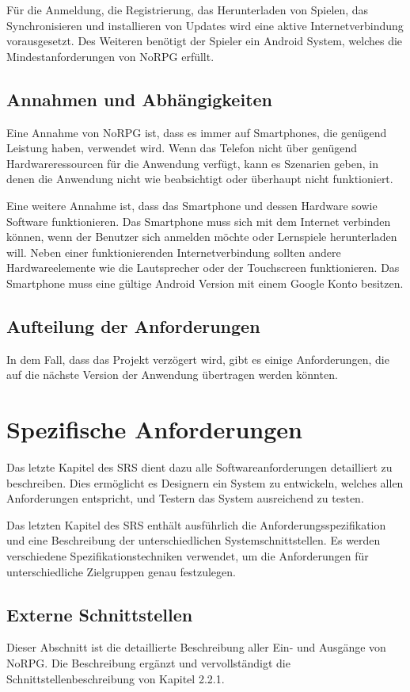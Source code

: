 		Für die Anmeldung, die Registrierung, das Herunterladen von Spielen, das Synchronisieren und installieren von Updates wird eine aktive Internetverbindung vorausgesetzt. Des Weiteren benötigt der Spieler ein Android System, welches die Mindestanforderungen von NoRPG erfüllt.
				
	\subsection{Annahmen und Abhängigkeiten}
		Eine Annahme von NoRPG ist, dass es immer auf Smartphones, die genügend Leistung haben, verwendet wird. Wenn das Telefon nicht über genügend Hardwareressourcen für die Anwendung verfügt, kann es Szenarien geben, in denen die Anwendung nicht wie beabsichtigt oder überhaupt nicht funktioniert.
		
		Eine weitere Annahme ist, dass das Smartphone und dessen Hardware sowie Software funktionieren. Das Smartphone muss sich mit dem Internet verbinden können, wenn der Benutzer sich anmelden möchte oder Lernspiele herunterladen will. Neben einer funktionierenden Internetverbindung sollten andere Hardwareelemente wie die Lautsprecher oder der Touchscreen funktionieren. Das Smartphone muss eine gültige Android Version mit einem Google Konto besitzen.
		
	\subsection{Aufteilung der Anforderungen}
		In dem Fall, dass das Projekt verzögert wird, gibt es einige Anforderungen, die auf die nächste Version der Anwendung übertragen werden könnten.

\section{Spezifische Anforderungen}
	Das letzte Kapitel des SRS dient dazu alle Softwareanforderungen detailliert zu beschreiben. Dies ermöglicht es Designern ein System zu entwickeln, welches allen Anforderungen entspricht, und Testern das System ausreichend zu testen.
	
	Das letzten Kapitel des SRS enthält ausführlich die Anforderungsspezifikation und eine Beschreibung der unterschiedlichen Systemschnittstellen. Es werden verschiedene Spezifikationstechniken verwendet, um die Anforderungen für unterschiedliche Zielgruppen genau festzulegen.
	
	\subsection{Externe Schnittstellen}
		Dieser Abschnitt ist die detaillierte Beschreibung aller Ein- und Ausgänge von NoRPG. Die Beschreibung ergänzt und vervollständigt die Schnittstellenbeschreibung von Kapitel 2.2.1. 
	
